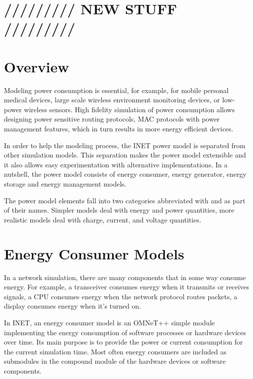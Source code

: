 \section{///////// NEW STUFF /////////}

\section{Overview}

Modeling power consumption is essential, for example, for mobile personal
medical devices, large scale wireless environment monitoring devices, or
low-power wireless sensors. High fidelity simulation of power consumption
allows designing power sensitive routing protocols, MAC protocols with
power management features, which in turn results in more energy efficient
devices.

In order to help the modeling process, the INET power model is separated
from other simulation models. This separation makes the power model
extensible and it also allows easy experimentation with alternative
implementations. In a nutshell, the power model consists of energy
consumer, energy generator, energy storage and energy management models.

The power model elements fall into two categories abbreviated with 
and  as part of their names. Simpler models deal with energy and
power quantities, more realistic models deal with charge, current, and
voltage quantities.

\section{Energy Consumer Models}

In a network simulation, there are many components that in some way consume
energy. For example, a transceiver consumes energy when it transmits or
receives signals, a CPU consumes energy when the network protocol routes
packets, a display consumes energy when it’s turned on.

In INET, an energy consumer model is an OMNeT++ simple module implementing
the energy consumption of software processes or hardware devices over time.
Its main purpose is to provide the power or current consumption for the
current simulation time. Most often energy consumers are included as
submodules in the compound module of the hardware devices or software
components.

